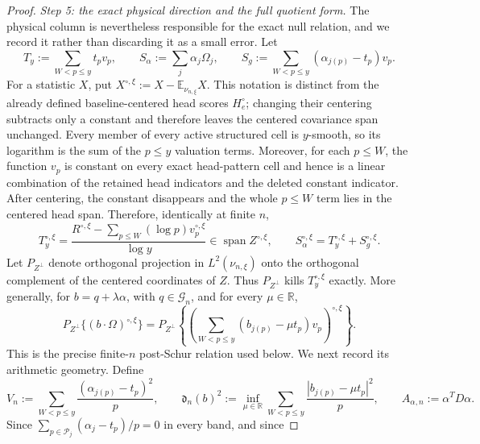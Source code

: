 \documentclass[11pt]{article}
\numberwithin{equation}{section}
\theoremstyle{definition}
\theoremstyle{remark}
\newcommand{\1}{\mathbf 1}
\begin{document}
\begin{proof}
\medskip\noindent
\emph{Step 5: the exact physical direction and the full quotient
form.}\quad
The physical column is nevertheless responsible for the exact null
relation, and we record it rather than discarding it as a small error.
Let
\[
 T_y:=\sum_{W<p\le y}t_pv_p,\qquad
 S_\alpha:=\sum_j\alpha_j\Omega_j,\qquad
 S_g:=\sum_{W<p\le y}(\alpha_{j(p)}-t_p)v_p.
\]
For a statistic \(X\), put
\(X^{\circ,\xi}:=X-\mathbb E_{\nu_{n,\xi}}X\).  This notation is
distinct from the already defined baseline-centered head scores
\(H_e^\circ\); changing their centering subtracts only a constant and
therefore leaves the centered covariance span unchanged.  Every member
of every active structured cell is \(y\)-smooth, so its logarithm is the
sum of the \(p\leq y\) valuation terms.  Moreover, for each \(p\leq W\),
the function \(v_p\) is constant on every exact head-pattern cell and
hence is a linear combination of the retained head indicators and the
deleted constant indicator.  After centering, the constant disappears
and the whole \(p\leq W\) term lies in the centered head span.  Therefore,
identically at finite \(n\),
\begin{equation}
 T_y^{\circ,\xi}=
 \frac{R^{\circ,\xi}
       -\sum_{p\le W}(\log p)v_p^{\circ,\xi}}{\log y}
 \in\operatorname{span}Z^{\circ,\xi},\qquad
 S_\alpha^{\circ,\xi}=T_y^{\circ,\xi}+S_g^{\circ,\xi}.
 \label{eq:smooth-physical-alpha-block-relation}
\end{equation}
Let \(P_{Z^\perp}\) denote orthogonal projection in
\(L^2(\nu_{n,\xi})\) onto the orthogonal complement of the centered
coordinates of \(Z\).  Thus \(P_{Z^\perp}\) kills
\(T_y^{\circ,\xi}\)
exactly.  More generally, for \(b=q+\lambda\alpha\), with
\(q\in\mathcal G_n\), and for every \(\mu\in\mathbb R\),
\begin{equation}
 P_{Z^\perp}\{(b\cdot\Omega)^{\circ,\xi}\}
 =P_{Z^\perp}\left\{
   \left(\sum_{W<p\leq y}
       (b_{j(p)}-\mu t_p)v_p\right)^{\circ,\xi}\right\}.
 \label{eq:smooth-exact-arithmetic-null-relation}
\end{equation}
This is the precise finite-\(n\) post-Schur relation used below.  We next
record its arithmetic geometry.  Define
\begin{equation}
 V_n:=\sum_{W<p\leq y}\frac{(\alpha_{j(p)}-t_p)^2}{p},\qquad
 \mathfrak d_n(b)^2:=\inf_{\mu\in\mathbb R}
   \sum_{W<p\leq y}\frac{|b_{j(p)}-\mu t_p|^2}{p},
 \qquad A_{\alpha,n}:=\alpha^TD\alpha.
 \label{eq:smooth-arithmetic-physical-distance}
\end{equation}
Since
\(\sum_{p\in\mathcal P_j}(\alpha_j-t_p)/p=0\) in every band, and since

\end{proof}
\end{document}
